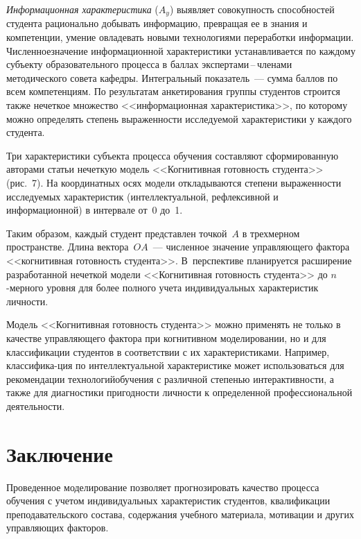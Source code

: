 \begin{multicols}{2}
     \textit{Информационная характеристика} ($A_y$) выявляет 
совокупность способностей студента рационально добывать информацию, 
превращая ее в знания и компетенции, умение овладевать новыми 
технологиями переработки информации. Численное\linebreak значение 
информационной характеристики устанавливается по каждому субъекту 
образовательного процесса в баллах экспертами\,--\,чле\-на\-ми методического 
совета кафедры. Интегральный показатель~--- сумма баллов по всем 
компетенциям. По результатам анкетирования группы студентов 
строится также  нечеткое множество <<информационная характеристика>>, по 
которому можно определять степень выраженности исследуемой 
характеристики у каж\-до\-го студента.
     
     Три характеристики субъекта процесса обучения составляют 
сформированную авторами статьи нечеткую модель <<Когнитивная 
готовность студента>> (рис.~7). На координатных осях модели 
откладываются степени выраженности исследуемых характеристик 
(интеллектуальной, рефлексивной и информационной) в интервале от~0 
до~1. 



     Таким образом, каждый студент представлен точкой~$A$ в 
трехмерном пространстве. Длина вектора~$OA$~--- численное значение 
управляющего фактора <<когнитивная готовность студента>>. 
В~перспективе планируется расширение разработанной нечеткой модели 
<<Когнитивная готовность студента>> до $n$-мер\-но\-го уровня для более 
полного учета индивидуальных характеристик личности.


     
     Модель <<Когнитивная готовность студента>> можно применять не 
только в качестве управ\-ля\-юще\-го фактора при когнитивном моделировании, 
но и для классификации студентов в соответствии с их характеристиками. 
Например, классифика-\linebreak ция по интеллектуальной характеристике может 
использоваться для рекомендации технологий\linebreak обуче\-ния с различной 
степенью интерактивности, а также для диагностики пригодности личности к 
определенной профессиональной деятельности.
     
     \section{Заключение}
     
     Проведенное моделирование позволяет прогнозировать качество 
процесса обучения с учетом индивидуальных характеристик студентов, 
квалификации преподавательского состава, содержания учебного 
материала, мотивации и других управляющих факторов. 
     

\end{multicols}
